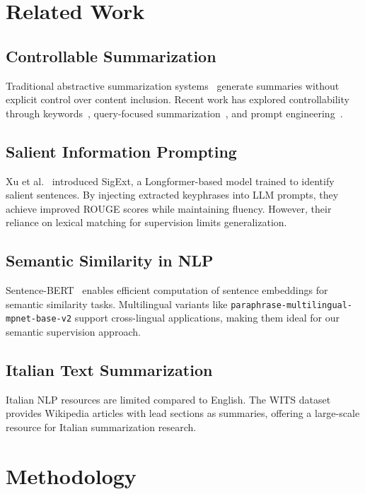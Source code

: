 \documentclass[conference]{IEEEtran}
\begin{document}
\section{Related Work}

\subsection{Controllable Summarization}
Traditional abstractive summarization systems~\cite{lewis2020bart, zhang2020pegasus} generate summaries without explicit control over content inclusion. Recent work has explored controllability through keywords~\cite{he2022ctrlsum}, query-focused summarization~\cite{xu2020query}, and prompt engineering~\cite{goyal2022news}.

\subsection{Salient Information Prompting}
Xu et al.~\cite{xu2024sip} introduced SigExt, a Longformer-based model trained to identify salient sentences. By injecting extracted keyphrases into LLM prompts, they achieve improved ROUGE scores while maintaining fluency. However, their reliance on lexical matching for supervision limits generalization.

\subsection{Semantic Similarity in NLP}
Sentence-BERT~\cite{reimers2019sbert} enables efficient computation of sentence embeddings for semantic similarity tasks. Multilingual variants like \texttt{paraphrase-multilingual-mpnet-base-v2} support cross-lingual applications, making them ideal for our semantic supervision approach.

\subsection{Italian Text Summarization}
Italian NLP resources are limited compared to English. The WITS dataset~\cite{casola2021wits} provides Wikipedia articles with lead sections as summaries, offering a large-scale resource for Italian summarization research.

\section{Methodology}
\end{document}
